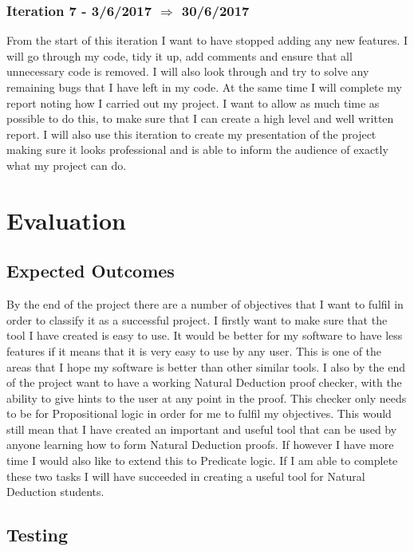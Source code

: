 \subsubsection{Iteration 7 - 3/6/2017 $\Rightarrow$ 30/6/2017}

From the start of this iteration I want to have stopped adding any new features. I will go through my code, tidy it up, add comments and ensure that all unnecessary code is removed. I will also look through and try to solve any remaining bugs that I have left in my code. At the same time I will complete my report noting how I carried out my project. I want to allow as much time as possible to do this, to make sure that I can create a high level and well written report. I will also use this iteration to create my presentation of the project making sure it looks professional and is able to inform the audience of exactly what my project can do.

\section{Evaluation}

\subsection{Expected Outcomes}

By the end of the project there are a number of objectives that I want to fulfil in order to classify it as a successful project. I firstly want to make sure that the tool I have created is easy to use. It would be better for my software to have less features if it means that it is very easy to use by any user. This is one of the areas that I hope my software is better than other similar tools. I also by the end of the project want to have a working Natural Deduction proof checker, with the ability to give hints to the user at any point in the proof. This checker only needs to be for Propositional logic in order for me to fulfil my objectives. This would still mean that I have created an important and useful tool that can be used by anyone learning how to form Natural Deduction proofs. If however I have more time I would also like to extend this to Predicate logic. If I am able to complete these two tasks I will have succeeded in creating a useful tool for Natural Deduction students.

\subsection{Testing}


